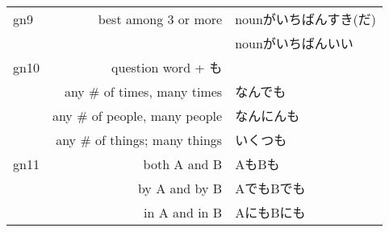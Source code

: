 \documentclass[extrafontsizes,14pt]{memoir}
\begin{document}
\begin{CJK}{UTF8}{min}
\begin{tabular}{lrl}
gn9&best among 3 or more&
  nounがいちばんすき(だ)\\
&&nounがいちばんいい\\
\hline

gn10&question word + も&\\
&any \# of times, many times&なんでも\\
&any \# of people, many people&なんにんも\\
&any \# of things; many things&いくつも\\
\hline

gn11&both A and B&AもBも\\
&by A and by B&AでもBでも\\
&in A and in B&AにもBにも\\

\end{tabular}

\end{CJK}
\end{document}
